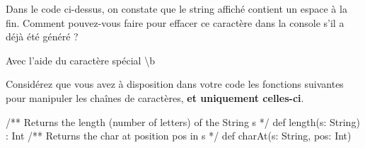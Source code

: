 \documentclass[10pt, a4paper, answers, addpoints]{\path exam}
\begin{document}
\begin{questions}
\begin{parts}
\begin{subparts}
		\begin{solutionordottedlines}[\fill]
		\end{solutionordottedlines}

		\bonussubpart[1]
		Dans le code ci-dessus, on constate que le string affiché contient un espace à la fin. Comment pouvez-vous faire pour effacer ce caractère dans la console s'il a déjà été généré ?

		\begin{solutionordottedlines}[1cm]
			Avec l'aide du caractère spécial \textbackslash b
		\end{solutionordottedlines}

	\end{subparts}
\end{parts}
\newpage

Considérez que vous avez à disposition dans votre code les fonctions suivantes pour manipuler les chaînes de caractères, \textbf{et uniquement celles-ci}.

\begin{scala}
	/** Returns the length (number of letters) of the String s */
	def length(s: String) : Int
	/** Returns the char at position pos in s */
	def charAt(s: String, pos: Int)
\end{scala}

\begin{parts}

\part[3]

\end{parts}
\end{questions}
\end{document}

